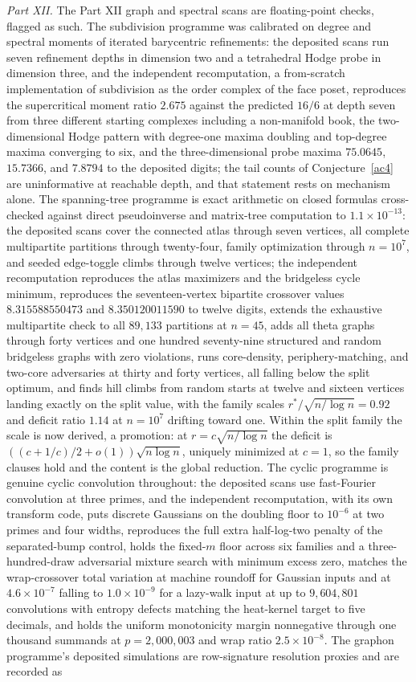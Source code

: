 \documentclass[11pt]{article}
\theoremstyle{definition}
\begin{document}
\emph{Part XII.}  The Part XII graph and spectral scans are floating-point checks, flagged as such.  The subdivision programme was calibrated on degree and spectral moments of iterated barycentric refinements: the deposited scans run seven refinement depths in dimension two and a tetrahedral Hodge probe in dimension three, and the independent recomputation, a from-scratch implementation of subdivision as the order complex of the face poset, reproduces the supercritical moment ratio $2.675$ against the predicted $16/6$ at depth seven from three different starting complexes including a non-manifold book, the two-dimensional Hodge pattern with degree-one maxima doubling and top-degree maxima converging to six, and the three-dimensional probe maxima $75.0645$, $15.7366$, and $7.8794$ to the deposited digits; the tail counts of Conjecture~\ref{ac4} are uninformative at reachable depth, and that statement rests on mechanism alone.  The spanning-tree programme is exact arithmetic on closed formulas cross-checked against direct pseudoinverse and matrix-tree computation to $1.1\times10^{-13}$: the deposited scans cover the connected atlas through seven vertices, all complete multipartite partitions through twenty-four, family optimization through $n=10^7$, and seeded edge-toggle climbs through twelve vertices; the independent recomputation reproduces the atlas maximizers and the bridgeless cycle minimum, reproduces the seventeen-vertex bipartite crossover values $8.315588550473$ and $8.350120011590$ to twelve digits, extends the exhaustive multipartite check to all $89{,}133$ partitions at $n=45$, adds all theta graphs through forty vertices and one hundred seventy-nine structured and random bridgeless graphs with zero violations, runs core-density, periphery-matching, and two-core adversaries at thirty and forty vertices, all falling below the split optimum, and finds hill climbs from random starts at twelve and sixteen vertices landing exactly on the split value, with the family scales $r^*/\sqrt{n/\log n}=0.92$ and deficit ratio $1.14$ at $n=10^7$ drifting toward one.  Within the split family the scale is now derived, a promotion: at $r=c\sqrt{n/\log n}$ the deficit is $((c+1/c)/2+o(1))\sqrt{n\log n}$, uniquely minimized at $c=1$, so the family clauses hold and the content is the global reduction.  The cyclic programme is genuine cyclic convolution throughout: the deposited scans use fast-Fourier convolution at three primes, and the independent recomputation, with its own transform code, puts discrete Gaussians on the doubling floor to $10^{-6}$ at two primes and four widths, reproduces the full extra half-log-two penalty of the separated-bump control, holds the fixed-$m$ floor across six families and a three-hundred-draw adversarial mixture search with minimum excess zero, matches the wrap-crossover total variation at machine roundoff for Gaussian inputs and at $4.6\times10^{-7}$ falling to $1.0\times10^{-9}$ for a lazy-walk input at up to $9{,}604{,}801$ convolutions with entropy defects matching the heat-kernel target to five decimals, and holds the uniform monotonicity margin nonnegative through one thousand summands at $p=2{,}000{,}003$ and wrap ratio $2.5\times10^{-8}$.  The graphon programme's deposited simulations are row-signature resolution proxies and are recorded as 
\end{document}

